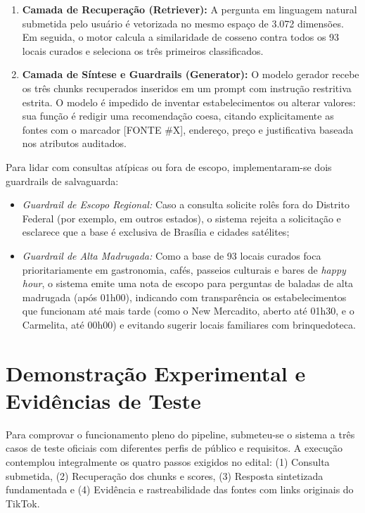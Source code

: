 \documentclass[12pt,a4paper]{article}
\begin{document}
\begin{enumerate}
\item \textbf{Camada de Recuperação (Retriever):} A pergunta em linguagem natural submetida pelo usuário é vetorizada no mesmo espaço de 3.072 dimensões. Em seguida, o motor calcula a similaridade de cosseno contra todos os 93 locais curados e seleciona os três primeiros classificados.
\item \textbf{Camada de Síntese e Guardrails (Generator):} O modelo gerador recebe os três chunks recuperados inseridos em um prompt com instrução restritiva estrita. O modelo é impedido de inventar estabelecimentos ou alterar valores: sua função é redigir uma recomendação coesa, citando explicitamente as fontes com o marcador [FONTE \#X], endereço, preço e justificativa baseada nos atributos auditados.
\end{enumerate}

Para lidar com consultas atípicas ou fora de escopo, implementaram-se dois guardrails de salvaguarda:
\begin{itemize}
\item \textit{Guardrail de Escopo Regional:} Caso a consulta solicite rolês fora do Distrito Federal (por exemplo, em outros estados), o sistema rejeita a solicitação e esclarece que a base é exclusiva de Brasília e cidades satélites;
\item \textit{Guardrail de Alta Madrugada:} Como a base de 93 locais curados foca prioritariamente em gastronomia, cafés, passeios culturais e bares de \textit{happy hour}, o sistema emite uma nota de escopo para perguntas de baladas de alta madrugada (após 01h00), indicando com transparência os estabelecimentos que funcionam até mais tarde (como o New Mercadito, aberto até 01h30, e o Carmelita, até 00h00) e evitando sugerir locais familiares com brinquedoteca.
\end{itemize}

\section{Demonstração Experimental e Evidências de Teste}

Para comprovar o funcionamento pleno do pipeline, submeteu-se o sistema a três casos de teste oficiais com diferentes perfis de público e requisitos. A execução contemplou integralmente os quatro passos exigidos no edital: (1) Consulta submetida, (2) Recuperação dos chunks e scores, (3) Resposta sintetizada fundamentada e (4) Evidência e rastreabilidade das fontes com links originais do TikTok.
\end{document}
